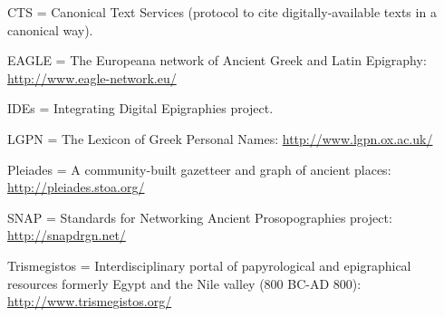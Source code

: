 \documentclass[amsthm,ebook]{saparticle}
\begin{document}
CTS = Canonical Text Services (protocol to cite digitally-available texts in a canonical way).

EAGLE = The Europeana network of Ancient Greek and Latin Epigraphy:  \url{http://www.eagle-network.eu/}

IDEs = Integrating Digital Epigraphies project.

LGPN = The Lexicon of Greek Personal Names: \url{http://www.lgpn.ox.ac.uk/}

Pleiades = A community-built gazetteer and graph of ancient places: \url{http://pleiades.stoa.org/}

SNAP = Standards for Networking Ancient Prosopographies project: \url{http://snapdrgn.net/}

Trismegistos = Interdisciplinary portal of papyrological and epigraphical resources formerly Egypt and the Nile valley
(800 BC-AD 800): \url{http://www.trismegistos.org/}

\nocite{moncunill_ochocientos_????}
\nocite{untermann_monumenta_1975}
\nocite{vallejo_antroponimia_????}



\end{document}
